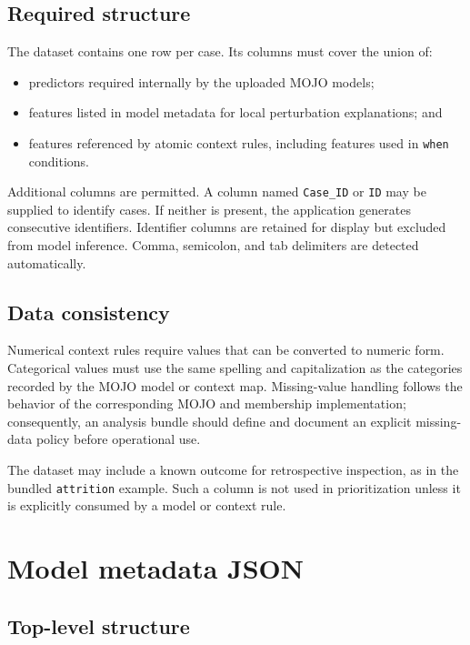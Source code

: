 \documentclass[11pt,a4paper]{article}
\begin{document}
\subsection{Required structure}

The dataset contains one row per case. Its columns must cover the union of:
\begin{itemize}
  \item predictors required internally by the uploaded MOJO models;
  \item features listed in model metadata for local perturbation explanations; and
  \item features referenced by atomic context rules, including features used in \texttt{when} conditions.
\end{itemize}

Additional columns are permitted. A column named \texttt{Case\_ID} or \texttt{ID} may be supplied to identify cases. If neither is present, the application generates consecutive identifiers. Identifier columns are retained for display but excluded from model inference. Comma, semicolon, and tab delimiters are detected automatically.

\subsection{Data consistency}

Numerical context rules require values that can be converted to numeric form. Categorical values must use the same spelling and capitalization as the categories recorded by the MOJO model or context map. Missing-value handling follows the behavior of the corresponding MOJO and membership implementation; consequently, an analysis bundle should define and document an explicit missing-data policy before operational use.

The dataset may include a known outcome for retrospective inspection, as in the bundled \texttt{attrition} example. Such a column is not used in prioritization unless it is explicitly consumed by a model or context rule.

\section{Model metadata JSON}

\subsection{Top-level structure}
\end{document}

